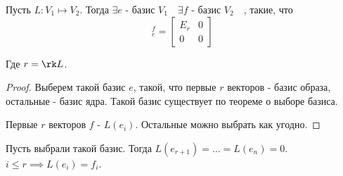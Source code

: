 \begin{theorem} \thmslashn

    Пусть $L : V_1 \mapsto V_2$. Тогда $\exists{e \text{ -  базис $V_1$}}\quad \exists{f \text{ - базис $V_2$}}\quad $, такие, что
    \begin{equation*}
        [L]_{e}^{f} = \begin{bmatrix} 
            E_{r} & 0\\
            0 & 0
        \end{bmatrix} 
    \end{equation*}

    Где $r = \rk L$.
    \begin{proof} \thmslashn
    
        Выберем такой базис $e$, такой, что первые $r$ векторов - базис образа, остальные - базис ядра. Такой базис существует по теореме о выборе базиса.

    Первые $r$ векторов $f$ - $L(e_{i})$. Остальные можно выбрать как угодно.
    \end{proof}
\end{theorem}
\begin{consequence} \thmslashn

    Пусть выбрали такой базис. Тогда $L(e_{r + 1}) = \ldots = L(e_{n}) = 0$. $i \le r \implies L(e_{i}) = f_{i}$.
\end{consequence}
